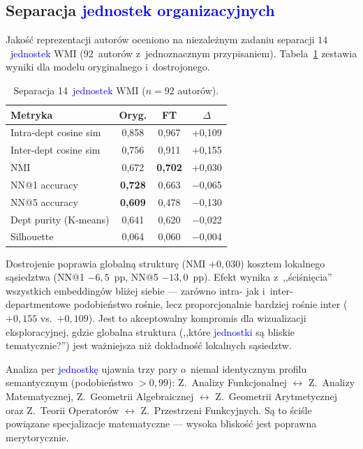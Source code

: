 \documentclass[a4paper,11pt,twocolumn]{article}
\newcommand{\hl}[1]{\textcolor{blue}{#1}}
\begin{document}
\subsection{Separacja \hl{jednostek organizacyjnych}}

Jakość reprezentacji autorów oceniono na niezależnym zadaniu separacji
$14$~\hl{jednostek} WMI ($92$~autorów z~jednoznacznym przypisaniem).
Tabela~\ref{tab:dept} zestawia wyniki dla modelu oryginalnego
i~dostrojonego.

\begin{table}[t]
\centering
\caption{Separacja 14~\hl{jednostek} WMI ($n=92$ autorów).}
\label{tab:dept}
\small
\begin{tabular}{@{}lccc@{}}
\toprule
Metryka & Oryg. & FT & $\Delta$ \\
\midrule
Intra-dept cosine sim    & 0,858 & 0,967 & +0,109 \\
Inter-dept cosine sim    & 0,756 & 0,911 & +0,155 \\
NMI                      & 0,672 & \textbf{0,702} & +0,030 \\
NN@1 accuracy            & \textbf{0,728} & 0,663 & $-$0,065 \\
NN@5 accuracy            & \textbf{0,609} & 0,478 & $-$0,130 \\
Dept purity (K-means)    & 0,641 & 0,620 & $-$0,022 \\
Silhouette               & 0,064 & 0,060 & $-$0,004 \\
\bottomrule
\end{tabular}
\end{table}

Dostrojenie poprawia globalną strukturę (NMI $+0{,}030$) kosztem
lokalnego sąsiedztwa (NN@1 $-6{,}5$~pp, NN@5 $-13{,}0$~pp). Efekt
wynika z~,,ściśnięcia'' wszystkich embeddingów bliżej siebie --- zarówno
intra- jak i~inter-departmentowe podobieństwo rośnie, lecz
proporcjonalnie bardziej rośnie inter ($+0{,}155$ vs.\ $+0{,}109$).
Jest to akceptowalny kompromis dla wizualizacji eksploracyjnej,
gdzie globalna struktura (,,które \hl{jednostki} są bliskie
tematycznie?'') jest ważniejsza niż dokładność lokalnych sąsiedztw.

Analiza per \hl{jednostkę} ujawnia trzy pary o~niemal identycznym
profilu semantycznym (podobieństwo $> 0{,}99$): Z.~Analizy Funkcjonalnej
$\leftrightarrow$ Z.~Analizy Matematycznej, Z.~Geometrii Algebraicznej
$\leftrightarrow$ Z.~Geometrii Arytmetycznej oraz Z.~Teorii Operatorów
$\leftrightarrow$ Z.~Przestrzeni Funkcyjnych. Są to ściśle powiązane
specjalizacje matematyczne --- wysoka bliskość jest poprawna merytorycznie.
\end{document}
